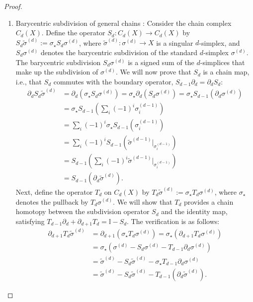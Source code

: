 \begin{proof}{\textit{\cite[Proof of Proposition 2.21]{hatcher2005algebraic}}}
\begin{enumerate}
	\item Barycentric subdivision of general chains \cite[Proposition 2.21 (3)]{hatcher2005algebraic}: Consider the chain complex \( C_d(X) \). Define the operator \( S_d: C_d(X) \to C_d(X) \) by \( S_d\tilde{\sigma}^{(d)} := \sigma_\star S_d\sigma^{(d)} \), where \( \tilde{\sigma}^{(d)}: \sigma^{(d)} \to X \) is a singular \( d \)-simplex, and \( S_d\sigma^{(d)} \) denotes the barycentric subdivision of the standard \( d \)-simplex \( \sigma^{(d)} \). The barycentric subdivision \( S_d\sigma^{(d)} \) is a signed sum of the \( d \)-simplices that make up the subdivision of \( \sigma^{(d)} \). We will now prove that \( S_d \) is a chain map, i.e., that \( S_d \) commutes with the boundary operator, \( S_{d-1}\partial_{d} = \partial_d S_d \):
	\begin{align}
		\partial_d S_d\tilde{\sigma}^{(d)} & = \partial_d (\sigma_\star S_d\sigma^{(d)}) = \sigma_\star \partial_d (S_d\sigma^{(d)}) = \sigma_\star S_{d-1}(\partial_d \sigma^{(d)}) \nonumber\\
		                 & = \sigma_\star S_{d-1}\left(\sum_i (-1)^i \sigma^{(d-1)}_i\right) \nonumber\\
		                 & = \sum_i (-1)^i \sigma_\star S_{d-1}(\sigma^{(d-1)}_i) \nonumber\\ 
		                 & = \sum_i (-1)^i S_{d-1}\left(\tilde{\sigma}^{(d-1)} \vert_{\sigma^{(d-1)}_i}\right) \nonumber\\
		                 & = S_{d-1}\left(\sum_i (-1)^i \tilde{\sigma}^{(d-1)} \vert_{\sigma^{(d-1)}_i}\right) \nonumber\\
		                 & = S_{d-1}(\partial_{d} \tilde{\sigma}^{(d)}). 
	\end{align}
	Next, define the operator \( T_d \) on \( C_d(X) \) by \( T_d\tilde{\sigma}^{(d)} := \sigma_\star T_d\sigma^{(d)} \), where \( \sigma_\star \) denotes the pullback by \( T_d\sigma^{(d)} \). We will show that \( T_d \) provides a chain homotopy between the subdivision operator \( S_d \) and the identity map, satisfying \( T_{d-1}\partial_{d} + \partial_{d+1} T_{d} = \mathbb{I} - S_{d} \). The verification is as follows:
	\begin{align}
		\partial_{d+1} T_d\tilde{\sigma}^{(d)} & = \partial_{d+1} (\sigma_\star T_d\sigma^{(d)}) = \sigma_\star (\partial_{d+1} T_d\sigma^{(d)}) \nonumber\\
		                 & = \sigma_\star (\sigma^{(d)} - S_{d}\sigma^{(d)} - T_{d-1}\partial_{d} \sigma^{(d)}) \nonumber\\
		                 & = \tilde{\sigma}^{(d)} - S_{d}\tilde{\sigma}^{(d)} - \sigma_\star T_{d-1}\partial_{d} \sigma^{(d)} \nonumber\\
		                 & = \tilde{\sigma}^{(d)} - S_{d}\tilde{\sigma}^{(d)} - T_{d-1}(\partial_d \tilde{\sigma}^{(d)}).                                        
	\end{align}
		

\end{enumerate}
\end{proof}
